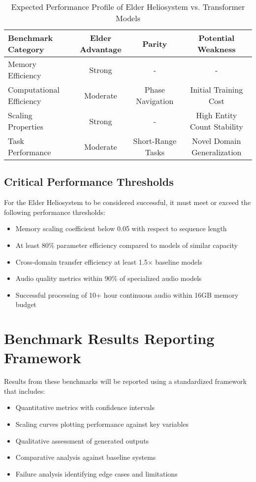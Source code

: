 \begin{table}[h]
\centering
\begin{tabular}{|l|c|c|c|}
\hline
\textbf{Benchmark Category} & \textbf{Elder Advantage} & \textbf{Parity} & \textbf{Potential Weakness} \\
\hline
Memory Efficiency & Strong & - & - \\
\hline
Computational Efficiency & Moderate & Phase Navigation & Initial Training Cost \\
\hline
Scaling Properties & Strong & - & High Entity Count Stability \\
\hline
Task Performance & Moderate & Short-Range Tasks & Novel Domain Generalization \\
\hline
\end{tabular}
\caption{Expected Performance Profile of Elder Heliosystem vs. Transformer Models}
\end{table}

\subsection{Critical Performance Thresholds}

For the Elder Heliosystem to be considered successful, it must meet or exceed the following performance thresholds:

\begin{itemize}
    \item Memory scaling coefficient below 0.05 with respect to sequence length
    \item At least 80\% parameter efficiency compared to models of similar capacity
    \item Cross-domain transfer efficiency at least 1.5× baseline models
    \item Audio quality metrics within 90\% of specialized audio models
    \item Successful processing of 10+ hour continuous audio within 16GB memory budget
\end{itemize}

\section{Benchmark Results Reporting Framework}

Results from these benchmarks will be reported using a standardized framework that includes:

\begin{itemize}
    \item Quantitative metrics with confidence intervals
    \item Scaling curves plotting performance against key variables
    \item Qualitative assessment of generated outputs
    \item Comparative analysis against baseline systems
    \item Failure analysis identifying edge cases and limitations
\end{itemize}

